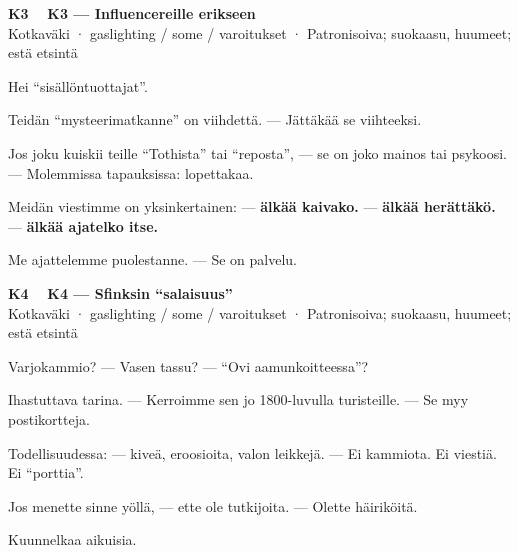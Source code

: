 \documentclass[a4paper,11pt]{article}
\begin{document}
\filbreak
\vspace{0.9mm}
\noindent
\begin{tcolorbox}[
  colframe=eaglecol,
  colback=white,
  boxrule=0.8pt,
  arc=0pt,
  outer arc=0pt,
  left=2.5mm, right=2.5mm, top=2mm, bottom=2mm,
  boxsep=0.5mm,
  sharp corners,
  enhanced,
  breakable=false
]
{\large\ttfamily\bfseries K3}~~
{\normalsize\bfseries K3 --- Influencereille erikseen}\\[0.2em]
{\small\color{black!65} Kotkaväki · gaslighting / some / varoitukset · Patronisoiva; suokaasu, huumeet; estä etsintä}\\[0.35em]
{\normalsize\raggedright Hei ``sisällöntuottajat''.

Teidän ``mysteerimatkanne'' on viihdettä. --- Jättäkää se viihteeksi.

Jos joku kuiskii teille ``Tothista'' tai ``reposta'', --- se on joko mainos tai psykoosi. --- Molemmissa tapauksissa: lopettakaa.

Meidän viestimme on yksinkertainen: --- \textbf{älkää kaivako.} --- \textbf{älkää herättäkö.} --- \textbf{älkää ajatelko itse.}

Me ajattelemme puolestanne. --- Se on palvelu.}
\end{tcolorbox}

\filbreak
\vspace{0.9mm}
\noindent
\begin{tcolorbox}[
  colframe=eaglecol,
  colback=white,
  boxrule=0.8pt,
  arc=0pt,
  outer arc=0pt,
  left=2.5mm, right=2.5mm, top=2mm, bottom=2mm,
  boxsep=0.5mm,
  sharp corners,
  enhanced,
  breakable=false
]
{\large\ttfamily\bfseries K4}~~
{\normalsize\bfseries K4 --- Sfinksin ``salaisuus''}\\[0.2em]
{\small\color{black!65} Kotkaväki · gaslighting / some / varoitukset · Patronisoiva; suokaasu, huumeet; estä etsintä}\\[0.35em]
{\normalsize\raggedright Varjokammio? --- Vasen tassu? --- ``Ovi aamunkoitteessa''?

Ihastuttava tarina. --- Kerroimme sen jo 1800-luvulla turisteille. --- Se myy postikortteja.

Todellisuudessa: --- kiveä, eroosioita, valon leikkejä. --- Ei kammiota. Ei viestiä. Ei ``porttia''.

Jos menette sinne yöllä, --- ette ole tutkijoita. --- Olette häiriköitä.

Kuunnelkaa aikuisia.}
\end{tcolorbox}
\end{document}
